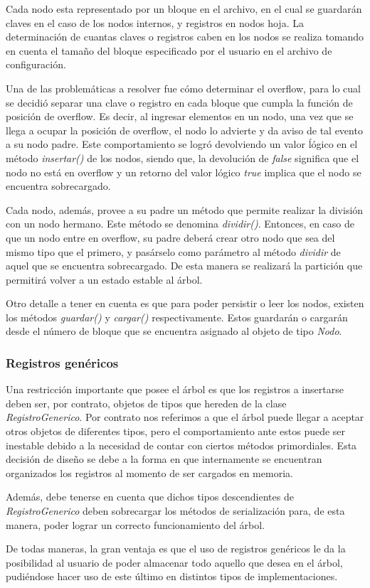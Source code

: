 \documentclass{article}
\begin{document}
	Cada nodo esta representado por un bloque en el archivo, en el cual se guardarán claves en el caso de los nodos internos, y registros en nodos hoja. La determinación de cuantas claves o registros caben en los nodos se realiza tomando en cuenta el tamaño del bloque especificado por el usuario en el archivo de configuración. 
	\par
	Una de las problemáticas a resolver fue cómo determinar el overflow, para lo cual se decidió separar una clave o registro en cada bloque que cumpla la función de posición de overflow. Es decir, al ingresar elementos en un nodo, una vez que se llega a ocupar la posición de overflow, el nodo lo advierte y da aviso de tal evento a su nodo padre. Este comportamiento se logró devolviendo un valor ĺógico en el método \textit{insertar()} de los nodos, siendo que, la devolución de \textit{false} significa que el nodo no está en overflow y un retorno del valor lógico \textit{true} implica que el nodo se encuentra sobrecargado.
	\par
	Cada nodo, además, provee a su padre un método que permite realizar la división con un nodo hermano. Este método se denomina \textit{dividir()}. Entonces, en caso de que un nodo entre en overflow, su padre deberá crear otro nodo que sea del mismo tipo que el primero, y pasárselo como parámetro al método \textit{dividir} de aquel que se encuentra sobrecargado. De esta manera se realizará la partición que permitirá volver a un estado estable al árbol.
	\par
	Otro detalle a tener en cuenta es que para poder persistir o leer los nodos, existen los métodos \textit{guardar()} y \textit{cargar()} respectivamente. Estos guardarán o cargarán desde el número de bloque que se encuentra asignado al objeto de tipo \textit{Nodo}.
\bigskip



\subsubsection{Registros genéricos}
	
	Una restricción importante que posee el árbol es que los registros a insertarse deben ser, por contrato, objetos de tipos que hereden de la clase \textit{RegistroGenerico}. Por contrato nos referimos a que el árbol puede llegar a aceptar otros objetos de diferentes tipos, pero el comportamiento ante estos puede ser inestable debido a la necesidad de contar con ciertos métodos primordiales. Esta decisión de diseño se debe a la forma en que internamente se encuentran organizados los registros al momento de ser cargados en memoria.
	\par
	Además, debe tenerse en cuenta que dichos tipos descendientes de \textit{RegistroGenerico} deben sobrecargar los métodos de serialización para, de esta manera, poder lograr un correcto funcionamiento del árbol.
	\par
	De todas maneras, la gran ventaja es que el uso de registros genéricos le da la posibilidad al usuario de poder almacenar todo aquello que desea en el árbol, pudiéndose hacer uso de este último en distintos tipos de implementaciones.
\bigskip
\end{document}
